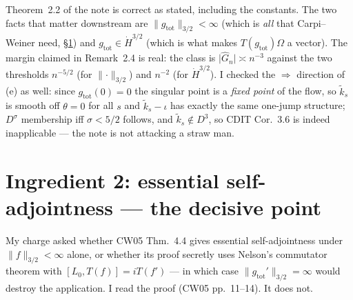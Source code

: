 \documentclass[11pt]{article}
\newcommand{\Om}{\Omega}
\newcommand{\nrm}[1]{\lVert #1\rVert}
\newcommand{\abz}[1]{\lvert #1\rvert}
\newcommand{\gtot}{g_{\mathrm{tot}}}
\newcommand{\ktil}{\widetilde k}
\begin{document}
\begin{verdictok}
Theorem~2.2 of the note is correct as stated, including the constants.  The two facts that matter downstream are
$\nrm\gtot_{3/2}<\infty$ (which is \emph{all} that Carpi--Weiner need, \S\ref{sec:esa}) and
$\gtot\in\dot H^{3/2}$ (which is what makes $T(\gtot)\Om$ a vector).  The margin claimed in Remark~2.4 is real:
the class is $\abz{\hat G_n}\asymp n^{-3}$ against the two thresholds $n^{-5/2}$ (for $\nrm\cdot_{3/2}$) and
$n^{-2}$ (for $\dot H^{3/2}$).  I checked the $\Rightarrow$ direction of (e) as well: since $\gtot(0)=0$ the
singular point is a \emph{fixed point} of the flow, so $\ktil_s$ is smooth off $\theta=0$ for all $s$ and
$\ktil_s-\iota$ has exactly the same one-jump structure; $D^\sigma$ membership iff $\sigma<5/2$ follows, and
$\ktil_s\notin D^3$, so CDIT Cor.~3.6 is indeed inapplicable --- the note is not attacking a straw man.
\end{verdictok}

\section{Ingredient 2: essential self-adjointness --- the decisive point}\label{sec:esa}

My charge asked whether CW05 Thm.~4.4 gives essential self-adjointness under $\nrm f_{3/2}<\infty$ alone, or
whether its proof secretly uses Nelson's commutator theorem with $[L_0,T(f)]=iT(f')$ --- in which case
$\nrm{\gtot'}_{3/2}=\infty$ would destroy the application.  I read the proof (CW05 pp.~11--14).  It does not.
\end{document}
